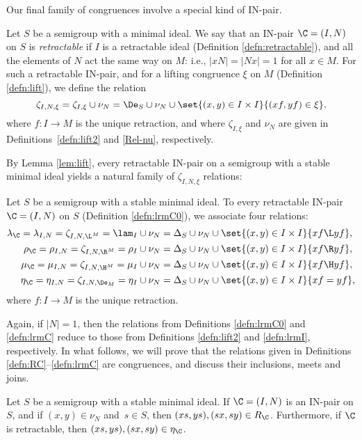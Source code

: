 Our final family of congruences involve a special kind of IN-pair.

\begin{defn}
\label{defn:lrmC0}
Let $S$ be a semigroup with a minimal ideal.
  We say that an IN-pair $\C=(I,N)$ on $S$ is
  \emph{retractable} if $I$ is a retractable ideal (Definition \ref{defn:retractable}), and all the elements of $N$ act the same way on $M$: i.e., $|xN|=|Nx|=1$ for all $x\in M$.
  For such a retractable IN-pair, and for a lifting congruence $\xi$ on $M$ (Definition \ref{defn:lift}), we
  define the relation
\[
\zeta_{I,N,\xi} = \zeta_{I,\xi}\cup\nu_N = \De_S\cup\nu_N\cup\set{(x,y)\in I\times I}{(xf,yf) \in \xi},
\]
where $f:I\to M$ is the unique retraction, and where $\zeta_{I, \xi}$ and $\nu_N$ are given in Definitions~\ref{defn:lift2} and \ref{Rel-nu}, respectively.
\end{defn}

By Lemma \ref{lem:lift}, every retractable IN-pair on a semigroup with a stable minimal ideal yields a natural family of $\zeta_{I,N,\xi}$ relations:

\begin{defn}
\label{defn:lrmC}
Let $S$ be a semigroup with a stable minimal ideal.  To every retractable IN-pair $\C=(I,N)$ on $S$ (Definition \ref{defn:lrmC0}), we associate four relations:
\begin{align*}
\lambda_\C=\lambda_{I,N}=\zeta_{I,N,{\L^M}}=\lam_I\cup\nu_N&=\Delta_S\cup\nu_N\cup\set{
  (x,y)\in I\times I}{ xf\L yf},\\
\rho_\C=\rho_{I,N}=\zeta_{I,N,{\R^M}}=\rho_I\cup\nu_N&=\Delta_S\cup\nu_N\cup\set{
  (x,y)\in I\times I}{ xf\R yf},\\
\mu_\C=\mu_{I,N}=\zeta_{I,N,{\H^M}}=\mu_I\cup\nu_N&=\Delta_S\cup\nu_N\cup\set{ (x,y)\in I\times I}{ xf\H yf},\\
\eta_\C=\eta_{I,N}=\zeta_{I,N,\De_M}=\eta_I\cup\nu_N&=\Delta_S\cup\nu_N\cup\set{ (x,y)\in I\times I}{ xf= yf},
\end{align*}
where $f:I\to M$ is the unique retraction.
\end{defn}

Again, if $|N|=1$, then the relations from Definitions \ref{defn:lrmC0} and
\ref{defn:lrmC} reduce to those from Definitions \ref{defn:lift2} and \ref{defn:lrmI}, respectively.  In what
follows, we will prove that the relations given in Definitions \ref{defn:RC}--\ref{defn:lrmC} are congruences, and discuss their inclusions, meets and
joins.

\begin{lemma}
\label{lem:nu}
Let $S$ be a semigroup with a stable minimal ideal.  If $\C=(I,N)$ is an IN-pair on $S$, and if $(x,y)\in\nu_N$ and~$s\in S$, then $(xs,ys),(sx,sy)\in R_\C$.  Furthermore, if $\C$ is retractable, then ${(xs,ys),(sx,sy)\in\eta_\C}$.
\end{lemma}

